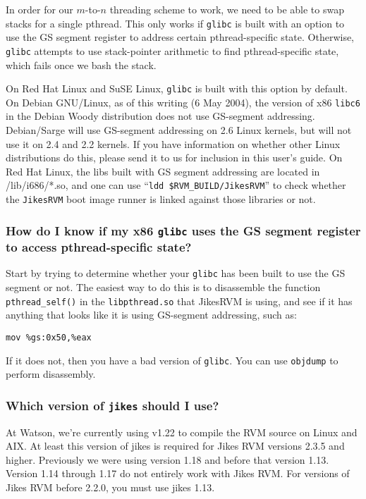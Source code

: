 In
order for our $m$-to-$n$ threading scheme to work, we need to be able to swap
stacks for a single pthread.  This only works if \texttt{glibc} is built with an
option to use the GS segment register to address certain pthread-specific
state.  Otherwise, \texttt{glibc} attempts to use stack-pointer
arithmetic to find pthread-specific state, which fails once we bash the stack.

On Red Hat\TMweb{} Linux and SuSE\Rweb{} Linux, \texttt{glibc} is
built with this option by default.  On
Debian\Rweb{} GNU/Linux, as of this writing (6 May 2004), the version of x86
\texttt{libc6} in the Debian Woody distribution does not use
GS-segment addressing.  Debian/Sarge will use GS-segment addressing on
2.6 Linux kernels, but will not use it on 2.4 and 2.2 kernels.  If you have
information on whether other Linux distributions do this, please
send it to us for inclusion in this user's guide.  On Red Hat Linux, the libs built with GS segment addressing are
located in /lib/i686/*.so, and one can use ``\texttt{ldd
  \$RVM\_BUILD/JikesRVM}'' to check whether the \texttt{JikesRVM} boot
image runner is linked against those libraries or not.  

\subsubsection{How do I know if my x86 \texttt{glibc} uses the GS
  segment register to access pthread-specific state?}%
%
%
%


Start by trying to determine whether your \texttt{glibc} has been
built to use the GS segment 
or not.  The easiest way to do this is to disassemble the function
\texttt{pthread\_self()} in the \texttt{libpthread.so} that JikesRVM is using, and see if it has
anything that looks like it is using GS-segment addressing, such as:
\begin{verbatim}
mov %gs:0x50,%eax
\end{verbatim}
If it does not, then you have a bad version of \texttt{glibc}.   You
can use \texttt{objdump} to perform disassembly.

\subsubsection{Which version of {\tt jikes} should I use?}
At Watson, we're currently using  v1.22
to compile the RVM source on Linux\Rweb{} and AIX\TMweb. At least this 
version of jikes is required for Jikes RVM versions 2.3.5 and higher.
Previously we were using version 1.18 and before that version
1.13. Version 1.14 through 1.17 do not entirely work with Jikes RVM.\@
For versions of Jikes RVM before 2.2.0, you must use jikes 1.13. 

